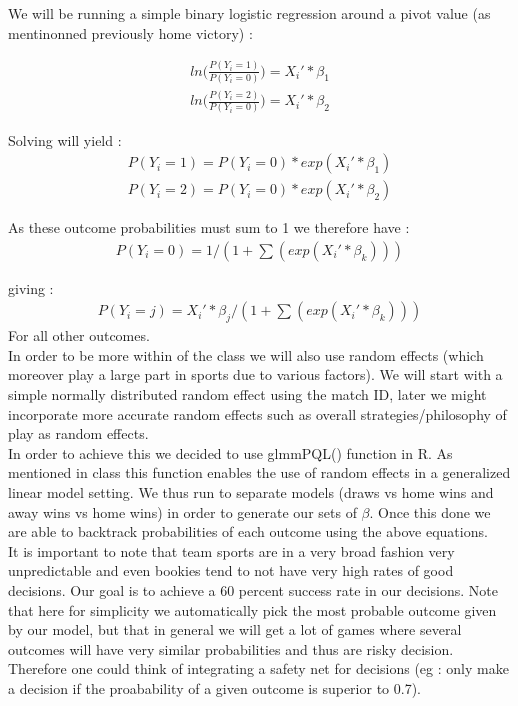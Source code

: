 \documentclass[letterpaper, 11pt]{article}
\theoremstyle{break}
\begin{document}
				We will be running a simple binary logistic regression around a pivot value (as mentinonned previously home victory) : 
				
				\begin{align*}
				ln \Big( \frac{P(Y_i = 1)}{P(Y_i = 0)} \Big) = X_i' * \beta_1 \\
				ln \Big( \frac{P(Y_i = 2)}{P(Y_i = 0)} \Big) = X_i' * \beta_2
				\end{align*}
				
				
				Solving will yield :
				\begin{align*}
				P(Y_i = 1) = P(Y_i = 0) * exp (X_i' * \beta_1) \\
				P(Y_i = 2) = P(Y_i = 0) * exp (X_i' * \beta_2)
				\end{align*}
				
				
				As these outcome probabilities must sum to 1 we therefore have :
				\begin{align*}
				P(Y_i = 0) = 1/(1 + \sum(exp(X_i' * \beta_k)) )
				\end{align*}
				
				
				giving :
				\begin{align*}
				P (Y_i = j) = X_i' * \beta_j / (1 + \sum(exp(X_i' * \beta_k)) )
				\end{align*}
				 For all other outcomes. \\
				 
				In order to be more within of the class we will also use random effects (which moreover play a large part in sports due to various factors). We will start with a simple normally distributed random effect using the match ID, later we might incorporate more accurate random effects such as overall strategies/philosophy of play as random effects. \\
				In order to achieve this we decided to use glmmPQL() function in R. As mentioned in class this function enables the use of random effects in a generalized linear model setting. 
				We thus run to separate models (draws vs home wins and away wins vs home wins) in order to generate our sets of $\beta$. Once this done we are able to backtrack probabilities of each outcome using the above equations. \\
				
				It is important to note that team sports are in a very broad fashion very unpredictable and even bookies tend to not have very high rates of good decisions. Our goal is to achieve a 60 percent success rate in our decisions. Note that here for simplicity we automatically pick the most probable outcome given by our model, but that in general we will get a lot of games where several outcomes will have very similar probabilities and thus are risky decision. Therefore one could think of integrating a safety net for decisions (eg : only make a decision if the proabability of a given outcome is superior to 0.7).\\
				
\end{document}
